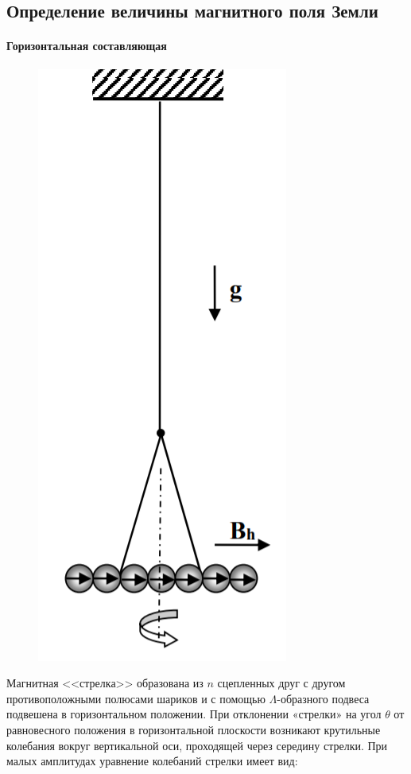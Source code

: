 \documentclass[a4paper,12pt]{article}
\begin{document}
\subsection*{Определение величины магнитного поля Земли}
\paragraph*{Горизонтальная составляющая}
\begin{figure}
\includegraphics[scale=0.5]{1.png}
\vspace{-60pt}
\end{figure}  
Магнитная <<стрелка>> образована из $n$ сцепленных друг с другом противоположными полюсами шариков и с помощью $\Lambda$-образного подвеса подвешена в горизонтальном положении. При отклонении «стрелки» на угол $\theta$ от равновесного положения в горизонтальной плоскости возникают крутильные колебания вокруг вертикальной оси, проходящей через середину стрелки. При малых амплитудах уравнение колебаний
стрелки имеет вид:
\end{document}
